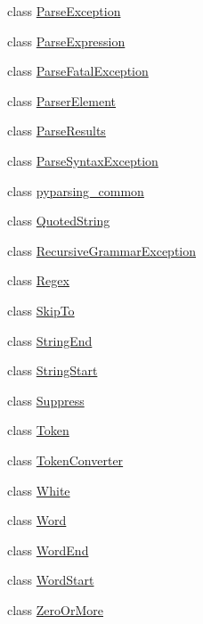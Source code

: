 \begin{DoxyCompactItemize}
class \hyperlink{classpkg__resources_1_1__vendor_1_1pyparsing_1_1_parse_exception}{Parse\+Exception}
\item 
class \hyperlink{classpkg__resources_1_1__vendor_1_1pyparsing_1_1_parse_expression}{Parse\+Expression}
\item 
class \hyperlink{classpkg__resources_1_1__vendor_1_1pyparsing_1_1_parse_fatal_exception}{Parse\+Fatal\+Exception}
\item 
class \hyperlink{classpkg__resources_1_1__vendor_1_1pyparsing_1_1_parser_element}{Parser\+Element}
\item 
class \hyperlink{classpkg__resources_1_1__vendor_1_1pyparsing_1_1_parse_results}{Parse\+Results}
\item 
class \hyperlink{classpkg__resources_1_1__vendor_1_1pyparsing_1_1_parse_syntax_exception}{Parse\+Syntax\+Exception}
\item 
class \hyperlink{classpkg__resources_1_1__vendor_1_1pyparsing_1_1pyparsing__common}{pyparsing\+\_\+common}
\item 
class \hyperlink{classpkg__resources_1_1__vendor_1_1pyparsing_1_1_quoted_string}{Quoted\+String}
\item 
class \hyperlink{classpkg__resources_1_1__vendor_1_1pyparsing_1_1_recursive_grammar_exception}{Recursive\+Grammar\+Exception}
\item 
class \hyperlink{classpkg__resources_1_1__vendor_1_1pyparsing_1_1_regex}{Regex}
\item 
class \hyperlink{classpkg__resources_1_1__vendor_1_1pyparsing_1_1_skip_to}{Skip\+To}
\item 
class \hyperlink{classpkg__resources_1_1__vendor_1_1pyparsing_1_1_string_end}{String\+End}
\item 
class \hyperlink{classpkg__resources_1_1__vendor_1_1pyparsing_1_1_string_start}{String\+Start}
\item 
class \hyperlink{classpkg__resources_1_1__vendor_1_1pyparsing_1_1_suppress}{Suppress}
\item 
class \hyperlink{classpkg__resources_1_1__vendor_1_1pyparsing_1_1_token}{Token}
\item 
class \hyperlink{classpkg__resources_1_1__vendor_1_1pyparsing_1_1_token_converter}{Token\+Converter}
\item 
class \hyperlink{classpkg__resources_1_1__vendor_1_1pyparsing_1_1_white}{White}
\item 
class \hyperlink{classpkg__resources_1_1__vendor_1_1pyparsing_1_1_word}{Word}
\item 
class \hyperlink{classpkg__resources_1_1__vendor_1_1pyparsing_1_1_word_end}{Word\+End}
\item 
class \hyperlink{classpkg__resources_1_1__vendor_1_1pyparsing_1_1_word_start}{Word\+Start}
\item 
class \hyperlink{classpkg__resources_1_1__vendor_1_1pyparsing_1_1_zero_or_more}{Zero\+Or\+More}
\end{DoxyCompactItemize}

